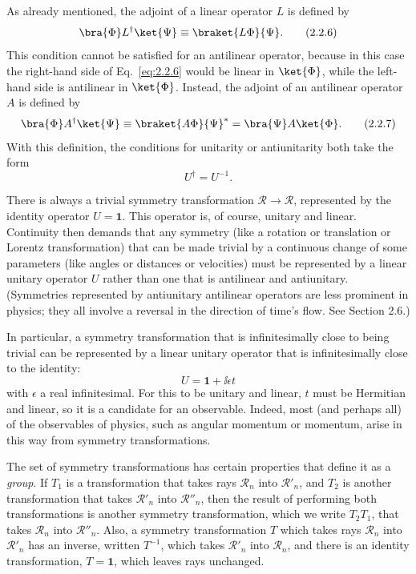 As already mentioned, the adjoint of a linear operator $L$ is defined by
\begin{equation}
  \bra{\Phi}L^{\dagger}\ket{\Psi}
    \equiv \braket{L\Phi}{\Psi}.
  \tag{2.2.6}\label{eq:2.2.6}
\end{equation}
This condition cannot be satisfied for an antilinear operator, because in
this case the right-hand side of Eq.~\eqref{eq:2.2.6} would be linear in
$\ket{\Phi}$, while the left-hand side is antilinear in $\ket{\Phi}$.
Instead, the adjoint of an antilinear operator $A$ is defined by
\begin{equation}
  \bra{\Phi}A^{\dagger}\ket{\Psi}
    \equiv \braket{A\Phi}{\Psi}^{*}
    =\bra{\Psi}A\ket{\Phi}.
  \tag{2.2.7}\label{eq:2.2.7}
\end{equation}
With this definition, the conditions for unitarity or antiunitarity both
take the form
\begin{equation}
  U^{\dagger}=U^{-1}.
  \tag{2.2.8}\label{eq:2.2.8}
\end{equation}

There is always a trivial symmetry transformation
$\mathcal{R}\to\mathcal{R}$, represented by the identity operator
$U=\mathbf{1}$. This operator is, of course, unitary and linear. Continuity
then demands that any symmetry (like a rotation or translation or Lorentz
transformation) that can be made trivial by a continuous change of some
parameters (like angles or distances or velocities) must be represented
by a linear unitary operator $U$ rather than one that is antilinear and
antiunitary. (Symmetries represented by antiunitary antilinear operators
are less prominent in physics; they all involve a reversal in the direction
of time's flow. See Section 2.6.)

In particular, a symmetry transformation that is infinitesimally close
to being trivial can be represented by a linear unitary operator that is
infinitesimally close to the identity:
\begin{equation}
  U=\mathbf{1}+\ii\epsilon t
  \tag{2.2.9}\label{eq:2.2.9}
\end{equation}
with $\epsilon$ a real infinitesimal. For this to be unitary and linear,
$t$ must be Hermitian and linear, so it is a candidate for an observable.
Indeed, most (and perhaps all) of the observables of physics, such as
angular momentum or momentum, arise in this way from symmetry
transformations.

The set of symmetry transformations has certain properties that define
it as a \emph{group}. If $T_1$ is a transformation that takes rays
$\mathcal{R}_n$ into $\mathcal{R}'_n$, and $T_2$ is another transformation
that takes $\mathcal{R}'_n$ into $\mathcal{R}''_n$, then the result of
performing both transformations is another symmetry transformation,
which we write $T_2T_1$, that takes $\mathcal{R}_n$ into
$\mathcal{R}''_n$. Also, a symmetry transformation $T$ which takes rays
$\mathcal{R}_n$ into $\mathcal{R}'_n$ has an inverse, written $T^{-1}$,
which takes $\mathcal{R}'_n$ into $\mathcal{R}_n$, and there is an identity
transformation, $T=\mathbf{1}$, which leaves rays unchanged.


